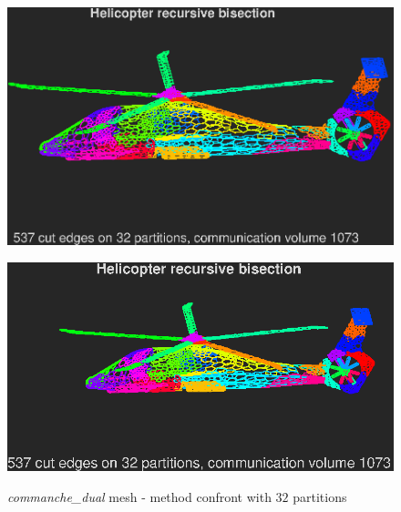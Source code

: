 \documentclass[unicode,11pt,a4paper,oneside,numbers=endperiod,openany]{scrartcl}
\begin{document}
\begin{figure}[H]
\begin{minipage}[H]{.45\textwidth}
        \label{fig:heli-kway-front-32}
    \end{minipage}
    \newline
    \begin{minipage}[H]{.45\textwidth}
        \centering
        \includegraphics[width=1\textwidth, trim={0 2.1cm 0.3cm 1.2cm}, clip]{./img/ex3/heli-rec-side-32}
        \label{fig:heli-rec-side-32}
    \end{minipage}
    \hfill
    \begin{minipage}[H]{.45\textwidth}
        \centering
        \includegraphics[width=1\textwidth, trim={1.3cm 1.8cm 1.8cm 0.9cm}, clip]{./img/ex3/heli-kway-side-32}
        \label{fig:heli-kway-side-32}
    \end{minipage}
    \label{fig:heli-rec-kway-32}
    \caption{\textit{commanche\_dual} mesh - method confront with $32$ partitions}
\end{figure}
\end{document}
